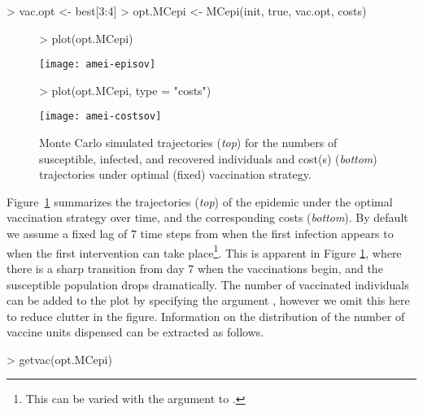 \documentclass[shortnames,nojss]{jss}
\begin{document}
\begin{Schunk}
\begin{Sinput}
> vac.opt <- best[3:4]
> opt.MCepi <- MCepi(init, true, vac.opt, costs)
\end{Sinput}
\end{Schunk}
\begin{figure}[ht!]
\begin{Schunk}
\begin{Sinput}
> plot(opt.MCepi)
\end{Sinput}
\end{Schunk}
\centering
\texttt{[image: amei-episov]}
\begin{Schunk}
\begin{Sinput}
> plot(opt.MCepi, type = "costs")
\end{Sinput}
\end{Schunk}
\centering
\texttt{[image: amei-costsov]}
\caption{Monte Carlo simulated trajectories ({\em top}) for the numbers of
susceptible, infected, and recovered individuals and cost(s) 
({\em bottom}) trajectories under optimal (fixed) vaccination strategy.}
\label{f:epis:ov}
\end{figure}
Figure~\ref{f:epis:ov} summarizes the trajectories ({\em top}) of the
epidemic under the optimal vaccination strategy over time, and the
corresponding costs ({\em bottom}). By default we assume a fixed lag of 7
time steps from when the first infection appears to when the first
intervention can take place\footnote{This can be varied with
  the  argument to .}. This is apparent in Figure
\ref{f:epis:ov}, where there is a sharp transition from day 7 when the
vaccinations begin, and the susceptible population drops dramatically.
The number of vaccinated individuals can be added to the plot by
specifying the argument , however we omit this here
to reduce clutter in the figure.  Information on the distribution of
the number of vaccine  units dispensed can be extracted as follows.
\begin{Schunk}
\begin{Sinput}
> getvac(opt.MCepi)
\end{Sinput}
\end{Schunk}
\end{document}
